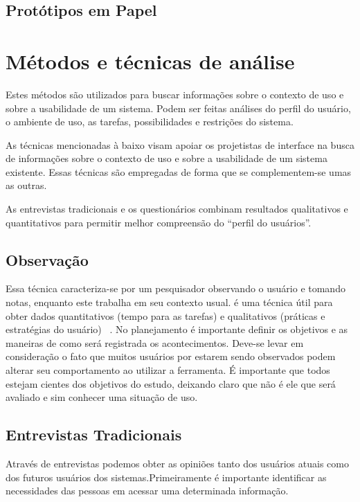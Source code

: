 \subsection{Protótipos em Papel}


\section{Métodos e técnicas de análise}

Estes métodos são utilizados para buscar informações sobre o contexto de uso e sobre a usabilidade de um sistema. Podem ser feitas análises do perfil do usuário, o ambiente de uso, as tarefas, possibilidades e restrições do sistema.

As técnicas mencionadas à baixo visam apoiar os projetistas de interface na busca de informações sobre o contexto de uso e sobre a usabilidade de um sistema existente. Essas técnicas são empregadas de forma que se complementem-se umas as outras.

As entrevistas tradicionais e os questionários combinam resultados qualitativos e quantitativos para permitir melhor compreensão do “perfil do usuários”.
	

\subsection{Observação}

Essa técnica caracteriza-se por um pesquisador observando o usuário e tomando notas, enquanto este trabalha em seu contexto usual. é uma técnica útil para obter dados quantitativos (tempo para as tarefas) e qualitativos (práticas e estratégias do usuário) ~\cite{cybis2010}.
	No planejamento é importante definir os objetivos e as maneiras de como será registrada os acontecimentos.
	Deve-se levar em consideração o fato que muitos usuários por estarem sendo observados podem alterar seu comportamento ao utilizar a ferramenta. É importante que todos estejam cientes dos objetivos do estudo, deixando claro que não é ele que será avaliado e sim conhecer uma situação de uso.

\subsection{Entrevistas Tradicionais}

Através de entrevistas podemos obter as opiniões tanto dos usuários atuais como dos futuros usuários dos sistemas.Primeiramente é importante identificar as necessidades das pessoas em acessar uma determinada informação.

